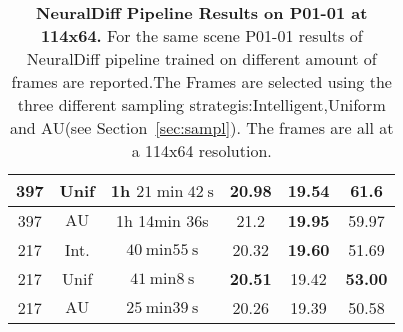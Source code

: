 \begin{table}[t]
\begin{tabular}{|c|c|c|c|c|c|}
\hline 397 & Unif &                                   1h $21 \min 42 \mathrm{~s}$                       & 20.98                  & 19.54                  & \textbf{61.6 }\\
\hline 397 & $\mathrm{AU}$ &                          1h 14min 36s                                      & 21.2                   & \textbf{19.95}         & 59.97 \\
\hline \rowcolor[HTML]{D9D9D9} 217 & Int. &           $40 \mathrm{~min} 55 \mathrm{~s}$                 & 20.32                  & \textbf{19.60}         & 51.69 \\
\hline \rowcolor[HTML]{D9D9D9} 217 & Unif &           $41 \mathrm{~min} 8 \mathrm{~s}$                  & \textbf{20.51}         & 19.42                  & \textbf{53.00} \\
\hline \rowcolor[HTML]{D9D9D9} 217 & $\mathrm{AU}$ &  $25 \mathrm{~min} 39 \mathrm{~s}$                 & 20.26                  & 19.39                  & 50.58 \\
\hline
\end{tabular}
\caption{\textbf{NeuralDiff Pipeline Results on P01-01 at 114x64. }For the same scene P01-01 results of NeuralDiff pipeline trained on different amount of frames are reported.The Frames
are selected using the three different sampling strategis:Intelligent,Uniform and AU(see Section~\ref{sec:sampl}). The frames are all at a 114x64 resolution.}\label{tab:EpicInt114}

\end{table}